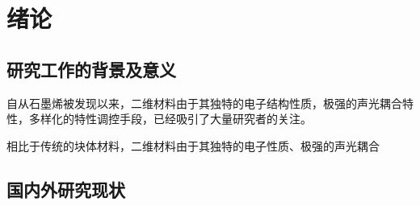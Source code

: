 \chapter{绪\hspace{6pt}论}

\section{研究工作的背景及意义}
自从石墨烯被发现以来，二维材料由于其独特的电子结构性质，极强的声光耦合特性，多样化的特性调控手段，已经吸引了大量研究者的关注。

相比于传统的块体材料，二维材料由于其独特的电子性质、极强的声光耦合


\section{国内外研究现状}